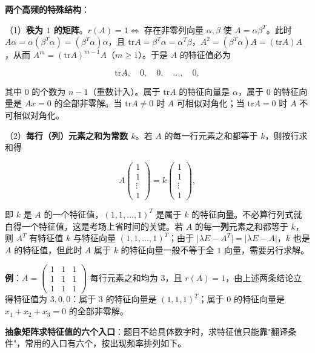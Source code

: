 \documentclass[11pt,openany,UTF8]{ctexbook}
\begin{document}
\textbf{两个高频的特殊结构}：

（1）\textbf{秩为 $1$ 的矩阵}。$r(A)=1\iff$ 存在非零列向量 $\alpha,\beta$ 使 $A=\alpha\beta^T$。此时 $A\alpha=\alpha(\beta^T\alpha)=(\beta^T\alpha)\alpha$，且 $\mathrm{tr}A=\beta^T\alpha=\alpha^T\beta$，$A^2=(\beta^T\alpha)A=(\mathrm{tr}A)A$，从而 $A^m=(\mathrm{tr}A)^{m-1}A$（$m\geq1$）。于是 $A$ 的特征值必为

\[\mathrm{tr}A,\quad 0,\quad 0,\quad \dots,\quad 0,\]

其中 $0$ 的个数为 $n-1$（重数计入）。属于 $\mathrm{tr}A$ 的特征向量是 $\alpha$，属于 $0$ 的特征向量是 $Ax=0$ 的全部非零解。当 $\mathrm{tr}A\neq0$ 时 $A$ 可相似对角化；当 $\mathrm{tr}A=0$ 时 $A$ 不可相似对角化。

（2）\textbf{每行（列）元素之和为常数 $k$}。若 $A$ 的每一行元素之和都等于 $k$，则按行求和得

\[A\begin{pmatrix}1\\1\\\vdots\\1\end{pmatrix}=k\begin{pmatrix}1\\1\\\vdots\\1\end{pmatrix},\]

即 $k$ 是 $A$ 的一个特征值，$(1,1,\dots,1)^T$ 是属于 $k$ 的特征向量。不必算行列式就白得一个特征值，这是考场上省时间的关键。若 $A$ 的每一\textbf{列}元素之和都等于 $k$，则 $A^T$ 有特征值 $k$ 与特征向量 $(1,1,\dots,1)^T$；由于 $\vert\lambda E-A^T\vert=\vert\lambda E-A\vert$，$k$ 也是 $A$ 的特征值，但此时 $A$ 属于 $k$ 的特征向量一般不等于全 $1$ 向量，需要另行求解。

\textbf{例}：$A=\begin{pmatrix}1&1&1\\1&1&1\\1&1&1\end{pmatrix}$ 每行元素之和均为 $3$，且 $r(A)=1$，由上述两条结论立得特征值为 $3,0,0$：属于 $3$ 的特征向量是 $(1,1,1)^T$；属于 $0$ 的特征向量是 $x_1+x_2+x_3=0$ 的全部非零解。

\textbf{抽象矩阵求特征值的六个入口}：题目不给具体数字时，求特征值只能靠"翻译条件"，常用的入口有六个，按出现频率排列如下。
\end{document}
